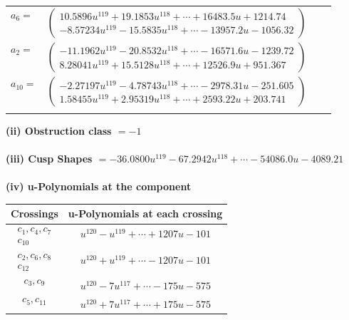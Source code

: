 \documentclass[1p]{elsarticle_modified}
\theoremstyle{definition}
\begin{document}
\begin{tabular}{m{7pt} m{180pt} m{7pt} m{180pt} }
\flushright $a_{6}=$&$\begin{pmatrix}10.5896 u^{119}+19.1853 u^{118}+\cdots+16483.5 u+1214.74\\-8.57234 u^{119}-15.5835 u^{118}+\cdots-13957.2 u-1056.32\end{pmatrix}$ \\
\flushright $a_{2}=$&$\begin{pmatrix}-11.1962 u^{119}-20.8532 u^{118}+\cdots-16571.6 u-1239.72\\8.28041 u^{119}+15.5128 u^{118}+\cdots+12526.9 u+951.367\end{pmatrix}$ \\
\flushright $a_{10}=$&$\begin{pmatrix}-2.27197 u^{119}-4.78743 u^{118}+\cdots-2978.31 u-251.605\\1.58455 u^{119}+2.95319 u^{118}+\cdots+2593.22 u+203.741\end{pmatrix}$\\&\end{tabular}
\flushleft \textbf{(ii) Obstruction class $= -1$}\\~\\
\flushleft \textbf{(iii) Cusp Shapes $= -36.0800 u^{119}-67.2942 u^{118}+\cdots-54086.0 u-4089.21$}\\~\\
\newpage\renewcommand{\arraystretch}{1}
\flushleft \textbf{(iv) u-Polynomials at the component}\newline \\
\begin{tabular}{m{50pt}|m{274pt}}
Crossings & \hspace{64pt}u-Polynomials at each crossing \\
\hline $$\begin{aligned}c_{1},c_{4},c_{7}\\c_{10}\end{aligned}$$&$\begin{aligned}
&u^{120}- u^{119}+\cdots+1207 u-101
\end{aligned}$\\
\hline $$\begin{aligned}c_{2},c_{6},c_{8}\\c_{12}\end{aligned}$$&$\begin{aligned}
&u^{120}+u^{119}+\cdots-1207 u-101
\end{aligned}$\\
\hline $$\begin{aligned}c_{3},c_{9}\end{aligned}$$&$\begin{aligned}
&u^{120}-7 u^{117}+\cdots-175 u-575
\end{aligned}$\\
\hline $$\begin{aligned}c_{5},c_{11}\end{aligned}$$&$\begin{aligned}
&u^{120}+7 u^{117}+\cdots+175 u-575
\end{aligned}$\\
\hline
\end{tabular}\\~\\
\end{document}
